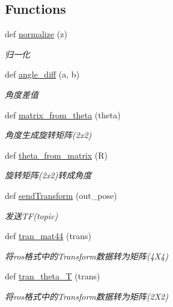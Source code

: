 \subsection*{Functions}
\begin{DoxyCompactItemize}
\item 
def \hyperlink{namespaceselect___a__dox_a933f572519bc5396421db86a68a37916}{normalize} (z)
\begin{DoxyCompactList}\small\item\em 归一化 \end{DoxyCompactList}\item 
def \hyperlink{namespaceselect___a__dox_a2e96d33700cc43f6769c8717a1538684}{angle\+\_\+diff} (a, b)
\begin{DoxyCompactList}\small\item\em 角度差值 \end{DoxyCompactList}\item 
def \hyperlink{namespaceselect___a__dox_aeb9ae60d7e093e9212176c74ab48f697}{matrix\+\_\+from\+\_\+theta} (theta)
\begin{DoxyCompactList}\small\item\em 角度生成旋转矩阵(2x2) \end{DoxyCompactList}\item 
def \hyperlink{namespaceselect___a__dox_a7b416b405b394ffdf3fb7ca9d91bd896}{theta\+\_\+from\+\_\+matrix} (R)
\begin{DoxyCompactList}\small\item\em 旋转矩阵(2x2)转成角度 \end{DoxyCompactList}\item 
def \hyperlink{namespaceselect___a__dox_a6b1af471c24514010bab83a744995d30}{send\+Transform} (out\+\_\+pose)
\begin{DoxyCompactList}\small\item\em 发送\+T\+F(topic) \end{DoxyCompactList}\item 
def \hyperlink{namespaceselect___a__dox_ac19f6260515ad57d2a375614405ec33d}{tran\+\_\+mat44} (trans)
\begin{DoxyCompactList}\small\item\em 将ros格式中的\+Transform数据转为矩阵(4\+X4) \end{DoxyCompactList}\item 
def \hyperlink{namespaceselect___a__dox_a62a8e3ea1a92df75e0ca42190f621777}{tran\+\_\+theta\+\_\+T} (trans)
\begin{DoxyCompactList}\small\item\em 将ros格式中的\+Transform数据转为矩阵(2\+X2) \end{DoxyCompactList}\item 

\end{DoxyCompactItemize}
